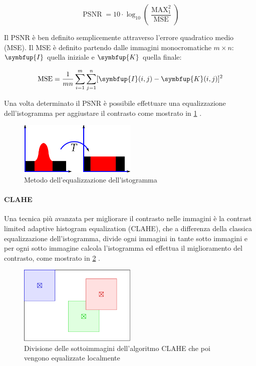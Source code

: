 \[ \operatorname{PSNR}=10 \cdot \log _{10}\left(\frac{\operatorname{MAX}_{1}^{2}}{\operatorname{MSE}}\right) \]

Il PSNR è ben definito semplicemente attraverso l'errore quadratico medio (MSE).
Il MSE è definito partendo dalle immagini monocromatiche \(m\times n\):  \(\symbfup{I}\) quella iniziale e \(\symbfup{K}\) quella finale:

\[ \operatorname{MSE}=\frac{1}{m n} \sum_{i=1}^{m} \sum_{j=1}^{n}[\symbfup{I}(i, j)-\symbfup{K}(i, j)]^{2} \]

Una volta determinato il PSNR è possibile effettuare una equalizzazione dell'istogramma per aggiustare il contrasto come mostrato in \cref{fig:histogram} \cite{sunaryo_preprocessing} \cite{pandey_contrast} \cite{hummel_histogram}.


\begin{figure}[ht]
    \centering
    \includegraphics[width=0.5\textwidth]{preprocessing/histogram.png}
    \caption{Metodo dell'equalizzazione dell'istogramma}
    \label{fig:histogram}
\end{figure}



\paragraph{CLAHE}\label{clahe}

Una tecnica più avanzata per migliorare il contrasto nelle immagini è la contrast limited adaptive histogram equalization (CLAHE), che a differenza della classica equalizzazione dell'istogramma, divide ogni immagini in tante sotto immagini e per ogni sotto immagine calcola l'istogramma ed effettua il miglioramento del contrasto, come mostrato in \cref{fig:clahe} \cite{hummel_histogram}.


\begin{figure}[ht]
    \centering
    \includegraphics[width=0.5\textwidth]{preprocessing/clahe.pdf}
    \caption{Divisione delle sottoimmagini dell'algoritmo CLAHE che poi vengono equalizzate localmente}
    \label{fig:clahe}
\end{figure}

